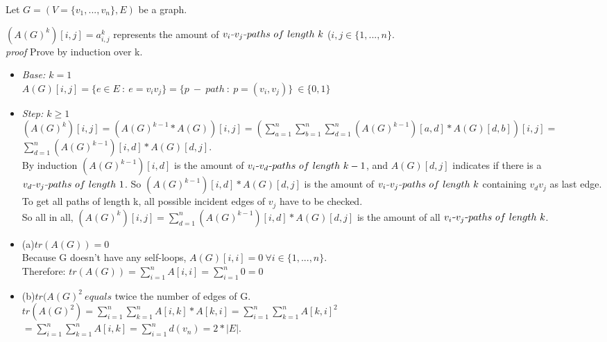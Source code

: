 \documentclass[a4paper]{article}
\newcommand{\unaryminus}{\scalebox{0.5}[1.0]{\( - \)}}
\begin{document}
	\begin{solution}{31}
	
		Let $G=(V=\{v_1,...,v_n\}, E)$ be a graph.
			
		\begin{mylemma}$(A(G)^k)[i,j]=a^k_{i,j}$ represents the amount of $v_i\unaryminus v_j \unaryminus paths ~of ~length~ k$ ($i,j \in \{1,...,n\}$.\\
		
			\emph{proof} Prove by induction over k.\\
			\begin{itemize}
				\item \emph{Base: $k=1$}\\
					$A(G)[i,j] =  \{e \in E ~ : ~ e=v_iv_j\} = \{p ~ - ~ path ~ : ~ p=(v_i,v_j)\} ~ \in \{0,1\}$
				\item \emph{Step: $k \ge 1$}\\
					$(A(G)^k)[i,j] = (A(G)^{k-1} * A(G))[i,j] = (\sum_{a=1}^{n}\sum_{b=1}^{n}\sum_{d=1}^{n}(A(G)^{k-1})[a,d] * A(G)[d,b])[i,j]=$\\
					$\sum_{d=1}^{n}(A(G)^{k-1})[i,d] * A(G)[d,j]$.\\
					By induction $(A(G)^{k-1})[i,d]$ is the amount of $v_i\unaryminus v_d\unaryminus paths~ of ~length~ k-1$, and $A(G)[d,j]$ indicates if there is a $v_d\unaryminus v_j\unaryminus paths~ of ~length ~1$. So $(A(G)^{k-1})[i,d] * A(G)[d,j]$ is the amount of $v_i\unaryminus v_j\unaryminus paths ~of ~length~ k$ containing $v_dv_j$ as last edge. To get all paths of length k, all possible incident edges of $v_j$ have to be checked.\\
					So all in all, $(A(G)^k)[i,j] = \sum_{d=1}^{n}(A(G)^{k-1})[i,d] * A(G)[d,j]$ is the amount of all $v_i\unaryminus v_j \unaryminus paths~ of ~length ~k$.
			\end{itemize} 
		\end{mylemma}
			
		\begin{itemize}
			\item (a)$tr(A(G))=0$\\
				Because G doesn't have any self-loops, $A(G)[i,i] = 0 ~ \forall i \in \{1,...,n\}$.\\
				Therefore: $tr(A(G))=\sum_{i=1}^{n}A[i,i] = \sum_{i=1}^{n}0=0$
				\\
			\item (b)$tr(A(G)^2 ~equals$ twice the number of edges of G.\\
				$tr(A(G)^2) = \sum_{i=1}^{n}\sum_{k=1}^{n}A[i,k] * A[k,i]=\sum_{i=1}^{n}\sum_{k=1}^{n}A[k,i]^2$\\
				$=\sum_{i=1}^{n}\sum_{k=1}^{n}A[i,k]=\sum_{i=1}^{n}d(v_n)=2*|E|$.
				

\end{itemize}
\end{solution}
\end{document}
